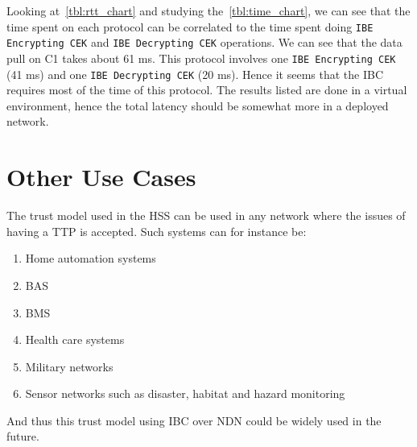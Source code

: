 Looking at~\autoref{tbl:rtt_chart} and studying the~\autoref{tbl:time_chart}, we can see that the time spent on each protocol can be correlated to the time spent doing \texttt{IBE Encrypting \gls{CEK}} and \texttt{IBE Decrypting \gls{CEK}} operations. 
We can see that the data pull on C1 takes about 61 ms.
This protocol involves one \texttt{IBE Encrypting \gls{CEK}} (41 ms) and one \texttt{IBE Decrypting \gls{CEK}} (20 ms). 
Hence it seems that the \gls{IBC} requires most of the time of this protocol.
The results listed are done in a virtual environment, hence the total latency should be somewhat more in a deployed network.

\section{Other Use Cases}
The trust model used in the \gls{HSS} can be used in any network where the issues of having a \gls{TTP} is accepted. 
Such systems can for instance be:
\begin{enumerate}
	\item Home automation systems
	\item \gls{BAS}
	\item \gls{BMS}
	\item Health care systems
	\item Military networks
	\item Sensor networks such as disaster, habitat and hazard monitoring
\end{enumerate}

And thus this trust model using \gls{IBC} over \gls{NDN} could be widely used in the future.
